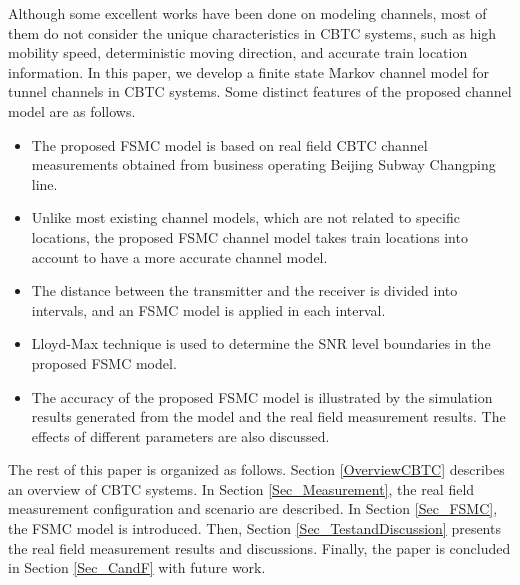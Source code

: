 \documentclass[conference]{IEEEtran}
\begin{document}
Although some excellent works have been done on modeling channels, most of them do not consider the unique characteristics in CBTC systems, such as high mobility speed, deterministic moving direction,  and accurate train location information. In this paper, we develop a finite state Markov channel model  for  tunnel channels in CBTC systems. Some distinct features of the proposed channel model are as follows.




\begin{itemize}
\item The proposed FSMC model is based on real field CBTC channel measurements obtained from business operating Beijing Subway Changping line.

\item Unlike most existing channel models, which are not related to specific locations, the proposed FSMC channel model takes train locations into account to have a more accurate channel model.



\item The distance between the transmitter and the receiver is divided into intervals, and an FSMC model is applied in each interval.



\item Lloyd-Max technique \cite{Least_squares_quantization_in_PCM} is used to determine the SNR level boundaries in the proposed FSMC model.

\item The accuracy of the proposed FSMC model is illustrated by the simulation results generated from the model and the real field measurement results. The effects of different parameters are also discussed.

\end{itemize}




The rest of this paper is organized as follows. Section \ref{OverviewCBTC} describes an overview of CBTC systems. In Section \ref{Sec_Measurement}, the real field measurement configuration and scenario are described. In Section \ref{Sec_FSMC}, the FSMC model is introduced. Then, Section \ref{Sec_TestandDiscussion} presents the real field measurement results and discussions. Finally, the paper is concluded in Section \ref{Sec_CandF} with future work.
\end{document}
